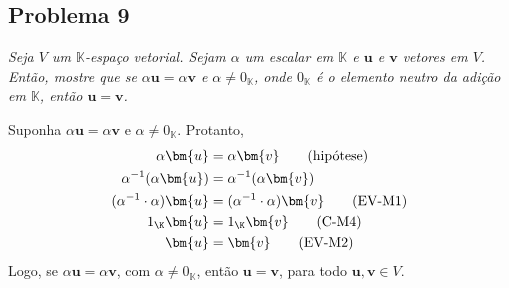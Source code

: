 \subsection*{Problema 9}
  \textit{Seja $V$ um $\mathbb{K}$-espaço vetorial.  Sejam $\alpha$ um escalar
  em $\mathbb{K}$ e $\bm{u}$ e  $\bm{v}$ vetores em $V$. Então, mostre
  que   se  $\alpha   \bm{u}   =  \alpha   \bm{v}$   e  $\alpha   \neq
  0_{\mathbb{K}}$, onde $0_{\mathbb{K}}$ é o elemento neutro da adição
  em $\mathbb{K}$, então $\bm{u} = \bm{v}$.}

Suponha $\alpha \bm{u} =  \alpha \bm{v}$ e $\alpha \neq 0_{\mathbb{K}}$.
Protanto,
\begin{align*}
  \alpha \bm{u} &=  \alpha \bm{v} \tag{hipótese}\\
  \alpha^{-1} (\alpha \bm{u}) &= \alpha^{-1} (\alpha \bm{v})  \\
  (\alpha^{-1} \cdot \alpha) \bm{u} &= (\alpha^{-1} \cdot \alpha) \bm{v} 
  \tag{EV-M1}  \\
  1_{\K} \bm{u} &= 1_{\K} \bm{v} \tag{C-M4}\\
  \bm{u} &= \bm{v} \tag{EV-M2}
\end{align*}
Logo, se $\alpha \bm{u} = \alpha \bm{v}$, com $\alpha \neq 0_{\mathbb{K}}$,
então $\bm{u} = \bm{v}$, para todo $\bm{u}, \bm{v} \in V$.

